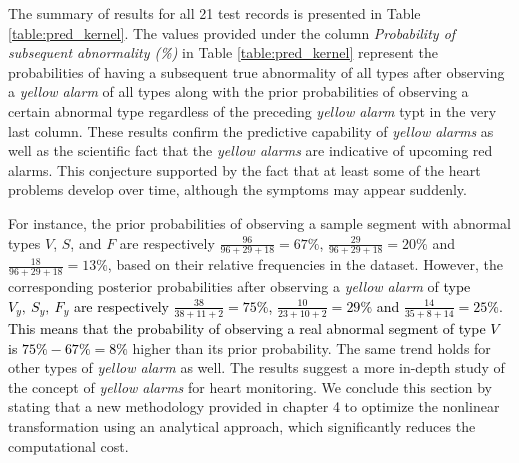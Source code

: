 The summary of results for all 21 test records is presented in Table \ref{table:pred_kernel}. The values provided under the column \textit{Probability of subsequent abnormality (\%)} in Table \ref{table:pred_kernel} represent the probabilities of having a subsequent true abnormality of all types after observing a \textit{yellow alarm} of all types along with the prior probabilities of observing a certain abnormal type regardless of the preceding \textit{yellow alarm} typt in the very last column. %
These results confirm the predictive capability of \textit{yellow alarms} as well as the scientific fact that the \textit{yellow alarms} are indicative of upcoming red alarms. This conjecture supported by the fact that at least some of the heart problems develop over time, although the symptoms may appear suddenly. 
 
For instance, the prior probabilities of observing a sample segment with abnormal types $V$, $S$, and $F$ are respectively $\frac{96}{96+29+18}=67\%$, $\frac{29}{96+29+18}=20\%$ and $\frac{18}{96+29+18}=13\%$, based on their relative frequencies in the dataset. However, the corresponding posterior probabilities after observing a \textit{yellow alarm} of \textcolor{black}{type $V_y,~S_y,~F_y$ are respectively $\frac{38}{38+11+2}=75\%$, $\frac{10}{23+10+2}=29\%$ and $\frac{14}{35+8+14}=25\%$. This means that the probability of observing a real abnormal segment of type $V$ is $75\%-67\%=8\%$} higher than its prior probability. The same trend holds for other types of \textit{yellow alarm} as well. The results suggest a more in-depth study of the concept of \textit{yellow alarms} for heart monitoring. 
We conclude this section by stating that a new methodology provided in chapter 4 to optimize the nonlinear transformation using an analytical approach, which significantly reduces the computational cost.

